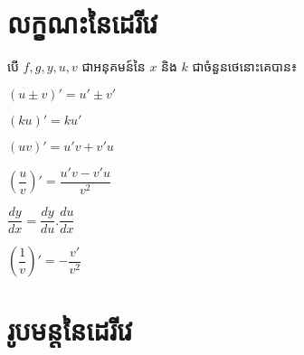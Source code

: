 \documentclass[12pt,fleqn]{book} %
\begin{document}
\newpage 
\section*{លក្ខណះនៃដេរីវេ}
\begin{property}
បើ $f,g,y,u,v$ ជាអនុគមន៍នៃ $x$ និង $k$ ជាចំនួនថេនោះគេបាន៖
\begin{enumerate}
\begin{multicols}{3}
\item $(u\pm v)'=u'\pm v'$
\item $(ku)'=k u'$
\item $(uv)'=u'v+v'u$
\item $\left( \dfrac{u}{v}\right)'=\dfrac{u'v-v'u}{v^2}$
\item $\dfrac{dy}{dx}=\dfrac{dy}{du}.\dfrac{du}{dx}$ 
\item $\left(\dfrac{1}{v}\right)'=-\dfrac{v'}{v^2}$
\end{multicols}
\end{enumerate}
\end{property}
\section{រូបមន្តនៃដេរីវេ}
\end{document}
